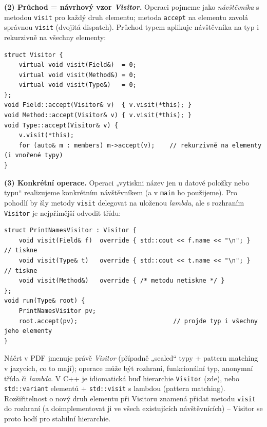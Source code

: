 \documentclass[11pt,a4paper]{article}
\newcommand{\cd}{\lstinline[style=cpp]}
\begin{document}
\begin{priklad}
\textbf{(2) Průchod = návrhový vzor \emph{Visitor}.} Operaci pojmeme jako \emph{návštěvníka} s metodou \texttt{visit} pro každý druh elementu; metoda \texttt{accept} na elementu zavolá správnou \texttt{visit} (dvojitá dispatch). Průchod typem aplikuje návštěvníka na typ i rekurzivně na všechny elementy:

\begin{lstlisting}[style=cpp]
struct Visitor {
    virtual void visit(Field&)  = 0;
    virtual void visit(Method&) = 0;
    virtual void visit(Type&)   = 0;
};
void Field::accept(Visitor& v)  { v.visit(*this); }
void Method::accept(Visitor& v) { v.visit(*this); }
void Type::accept(Visitor& v) {
    v.visit(*this);
    for (auto& m : members) m->accept(v);    // rekurzivně na elementy (i vnořené typy)
}
\end{lstlisting}

\textbf{(3) Konkrétní operace.} Operaci „vytiskni název jen u datové položky nebo typu`` realizujeme konkrétním návštěvníkem (a v \texttt{main} ho použijeme). Pro pohodlí by šly metody \texttt{visit} delegovat na uloženou \emph{lambdu}, ale s rozhraním \texttt{Visitor} je nejpřímější odvodit třídu:

\begin{lstlisting}[style=cpp]
struct PrintNamesVisitor : Visitor {
    void visit(Field& f)  override { std::cout << f.name << "\n"; }  // tiskne
    void visit(Type& t)   override { std::cout << t.name << "\n"; }  // tiskne
    void visit(Method&)   override { /* metodu netiskne */ }
};
void run(Type& root) {
    PrintNamesVisitor pv;
    root.accept(pv);                          // projde typ i všechny jeho elementy
}
\end{lstlisting}

\begin{poznamka}
Náčrt v PDF jmenuje právě \emph{Visitor} (případně „sealed`` typy + pattern matching v jazycích, co to mají); operace může být rozhraní, funkcionální typ, anonymní třída či \emph{lambda}. V C++ je idiomatická buď hierarchie \texttt{Visitor} (zde), nebo \cd{std::variant} elementů $+$ \cd{std::visit} s lambdou (pattern matching). Rozšiřitelnost o nový druh elementu při Visitoru znamená přidat metodu \texttt{visit} do rozhraní (a doimplementovat ji ve všech existujících návštěvnících) -- Visitor se proto hodí pro stabilní hierarchie.
\end{poznamka}
\end{priklad}
\end{document}
